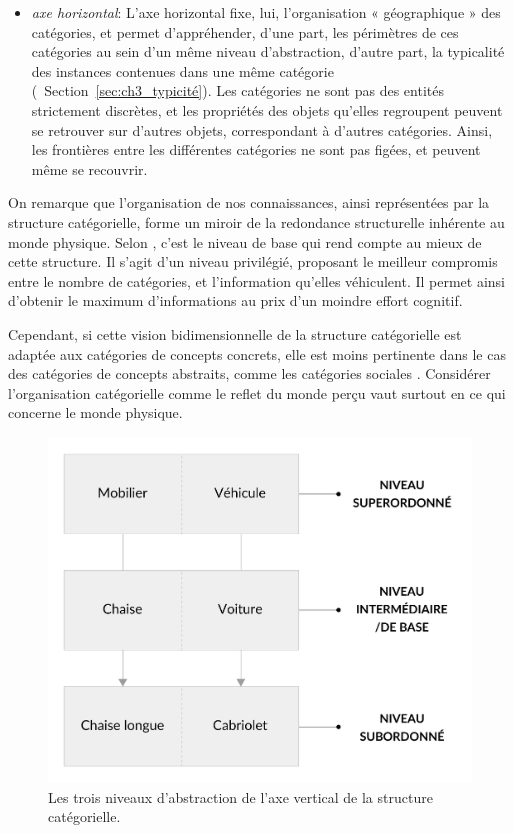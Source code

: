 \begin{itemize}
\item \textit{axe horizontal}: L'axe horizontal fixe, lui, l'organisation « géographique » des catégories, et permet d'appréhender, d'une part, les périmètres de ces catégories au sein d'un même niveau d'abstraction, d'autre part, la typicalité des instances contenues dans une même catégorie (\cf~Section~\ref{sec:ch3_typicité}). Les catégories ne sont pas des entités strictement discrètes, et les propriétés des objets qu'elles regroupent peuvent se retrouver sur d'autres objets, correspondant à d'autres catégories. Ainsi, les frontières entre les différentes catégories ne sont pas figées, et peuvent même se recouvrir.
\end{itemize}

On remarque que l'organisation de nos connaissances, ainsi représentées par la structure catégorielle, forme un miroir de la redondance structurelle inhérente au monde physique. Selon \citep[p. 28]{rosch1978cognition}, c'est le niveau de base qui rend compte au mieux de cette structure. Il s'agit d'un niveau privilégié, proposant le meilleur compromis entre le nombre de catégories, et l'information qu'elles véhiculent. Il permet ainsi d'obtenir le maximum d'informations au prix d'un moindre effort cognitif.

Cependant, si cette vision bidimensionnelle de la structure catégorielle est adaptée aux catégories de concepts concrets, elle est moins pertinente dans le cas des catégories de concepts abstraits, comme les catégories sociales \citep[p. 72-88]{dubois1991semantique}. Considérer l'organisation catégorielle comme le reflet du monde perçu vaut surtout en ce qui concerne le monde physique.

\begin{figure}[t]
        \myfloatalign
        \includegraphics[width=.6\linewidth]{gfx/ch_3/categorieLVL}
        \caption{Les trois niveaux d'abstraction de l'axe vertical de la structure catégorielle.}\label{fig:categorieLVL}
\end{figure}

